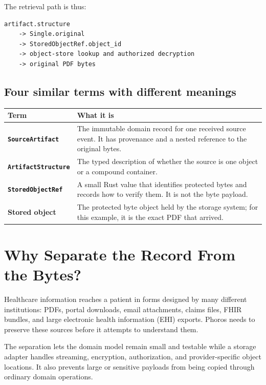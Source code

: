 \documentclass[11pt]{article}
\newcommand{\code}[1]{\texttt{#1}}
\begin{document}
The retrieval path is thus:

\begin{lstlisting}
artifact.structure
    -> Single.original
    -> StoredObjectRef.object_id
    -> object-store lookup and authorized decryption
    -> original PDF bytes
\end{lstlisting}

\subsection{Four similar terms with different meanings}

\begin{center}
\begin{tabularx}{\textwidth}{>{\bfseries}p{} X}
\toprule
Term & What it is \\
\midrule
\code{SourceArtifact} & The immutable domain record for one received source event. It has provenance and a nested reference to the original bytes. \\
\code{ArtifactStructure} & The typed description of whether the source is one object or a compound container. \\
\code{StoredObjectRef} & A small Rust value that identifies protected bytes and records how to verify them. It is not the byte payload. \\
Stored object & The protected byte object held by the storage system; for this example, it is the exact PDF that arrived. \\
\bottomrule
\end{tabularx}
\end{center}

\section{Why Separate the Record From the Bytes?}

Healthcare information reaches a patient in forms designed by many different institutions: PDFs, portal downloads, email attachments, claims files, FHIR bundles, and large electronic health information (EHI) exports. Phoros needs to preserve these sources before it attempts to understand them.

The separation lets the domain model remain small and testable while a storage adapter handles streaming, encryption, authorization, and provider-specific object locations. It also prevents large or sensitive payloads from being copied through ordinary domain operations.
\end{document}
